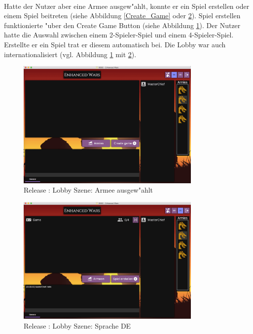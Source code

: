\documentclass[12pt, titlepage]{scrartcl}
\newcommand{\RN}[1]{%
	\textup{\uppercase\expandafter{\romannumeral#1}}%
}
\begin{document}
			    \ \vspace{0.5cm} \\ Hatte der Nutzer aber eine Armee ausgew"ahlt, konnte er ein Spiel erstellen oder einem Spiel beitreten (siehe Abbildung \ref{Create_Game} oder \ref{Lobby_Language}). Spiel erstellen funktionierte "uber den Create Game Button (siehe Abbildung \ref{Lobby_Army_Selected}). Der Nutzer hatte die Auswahl zwischen einem 2-Spieler-Spiel und einem 4-Spieler-Spiel. Erstellte er ein Spiel trat er diesem automatisch bei. Die Lobby war auch internationalisiert (vgl. Abbildung \ref{Lobby_Army_Selected} mit \ref{Lobby_Language}). \\
			    \begin{figure}[H] 
    				\centering
    				\includegraphics[width=0.8\textwidth]{images/old_state/lobby/ArmySelected.png}
    				\caption{Release \RN{2}: Lobby Szene: Armee ausgew"ahlt}
    				\label{Lobby_Army_Selected}
			    \end{figure}
			    \begin{figure}[H] 
    				\centering
    				\includegraphics[width=0.8\textwidth]{images/old_state/lobby/International+Chat+GameCreated.png}
    				\caption{Release \RN{2}: Lobby Szene: Sprache DE}
    				\label{Lobby_Language}
			    \end{figure}
\end{document}
